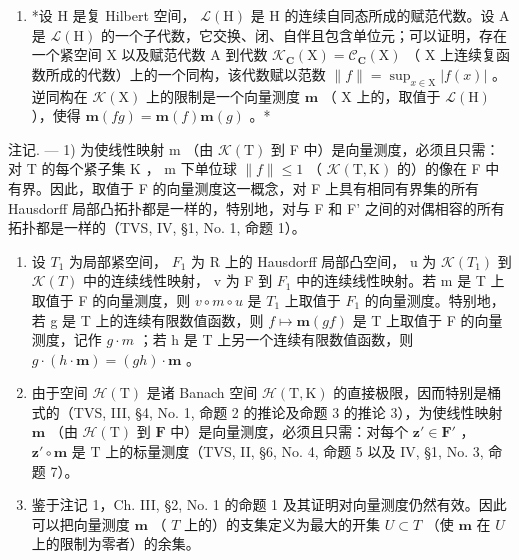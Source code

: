 \begin{enumerate}
\def\labelenumi{\arabic{enumi})}
\setcounter{enumi}{1}
\tightlist
\item
  *设 H 是复 Hilbert 空间， \(\mathcal{L}(\mathrm{H})\) 是 H 的连续自同态所成的赋范代数。设 A 是 \(\mathcal{L}(\mathrm{H})\) 的一个子代数，它交换、闭、自伴且包含单位元；可以证明，存在一个紧空间 X 以及赋范代数 A 到代数 \(\mathcal{K}_{\mathbf{C}}(\mathrm{X}) = \mathcal{C}_{\mathbf{C}}(\mathrm{X})\) （ X 上连续复函数所成的代数）上的一个同构，该代数赋以范数 \(\| f \| = \sup_{x \in \mathrm{X}} |f(x)|\) 。逆同构在 \(\mathcal{K}(\mathrm{X})\) 上的限制是一个向量测度 \(\mathbf{m}\) （ X 上的，取值于 \(\mathcal{L}(\mathrm{H})\) ），使得 \(\mathbf{m}(fg) = \mathbf{m}(f)\mathbf{m}(g)\) 。*
\end{enumerate}

注记. --- 1) 为使线性映射 m （由 \(\mathcal{K}(\mathrm{T})\) 到 F 中）是向量测度，必须且只需：对 T 的每个紧子集 K ， m 下单位球 \(\|f\|\leqslant1\) （ \(\mathcal{K}(\mathrm{T},\mathrm{K})\) 的）的像在 F 中有界。因此，取值于 F 的向量测度这一概念，对 F 上具有相同有界集的所有 Hausdorff 局部凸拓扑都是一样的，特别地，对与 F 和 F' 之间的对偶相容的所有拓扑都是一样的（TVS, IV, §1, No. 1, 命题 1）。

\begin{enumerate}
\def\labelenumi{\arabic{enumi})}
\setcounter{enumi}{1}
\item
  设 \(T_{1}\) 为局部紧空间， \(F_{1}\) 为 R 上的 Hausdorff 局部凸空间， u 为 \(\mathcal{K}(T_{1})\) 到 \(\mathcal{K}(T)\) 中的连续线性映射， v 为 F 到 \(F_{1}\) 中的连续线性映射。若 m 是 T 上取值于 F 的向量测度，则 \(v \circ m \circ u\) 是 \(T_{1}\) 上取值于 \(F_{1}\) 的向量测度。特别地，若 g 是 T 上的连续有限数值函数，则 \(f \mapsto \mathbf{m}(gf)\) 是 T 上取值于 F 的向量测度，记作 \(g \cdot m\) ；若 h 是 T 上另一个连续有限数值函数，则 \(g \cdot (h \cdot \mathbf{m}) = (gh) \cdot \mathbf{m}\) 。
\item
  由于空间 \(\mathcal{H}(\mathrm{T})\) 是诸 Banach 空间 \(\mathcal{H}(\mathrm{T},\mathrm{K})\) 的直接极限，因而特别是桶式的（TVS, III, §4, No. 1, 命题 2 的推论及命题 3 的推论 3），为使线性映射 \(\mathbf{m}\) （由 \(\mathcal{H}(\mathrm{T})\) 到 \(\mathbf{F}\) 中）是向量测度，必须且只需：对每个 \(\mathbf{z}' \in \mathbf{F}'\) ， \(\mathbf{z}' \circ \mathbf{m}\) 是 \(\mathrm{T}\) 上的标量测度（TVS, II, §6, No. 4, 命题 5 以及 IV, §1, No. 3, 命题 7）。
\item
  鉴于注记 1，Ch. III, §2, No. 1 的命题 1 及其证明对向量测度仍然有效。因此可以把向量测度 \(\mathbf{m}\) （ \(T\) 上的）的支集定义为最大的开集 \(U \subset T\) （使 \(\mathbf{m}\) 在 \(U\) 上的限制为零者）的余集。
\end{enumerate}

